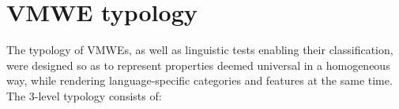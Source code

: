\documentclass[output=paper,modfonts]{langscibook}
\begin{document}
\section{VMWE typology}
\label{sec:typology}
%
The typology of VMWEs, 
as well as linguistic tests enabling their %
classification, were designed so as to represent %
properties deemed universal in a homogeneous way, while rendering language-specific categories and features at the same time. %
%
The 3-level typology consists of:
\end{document}
